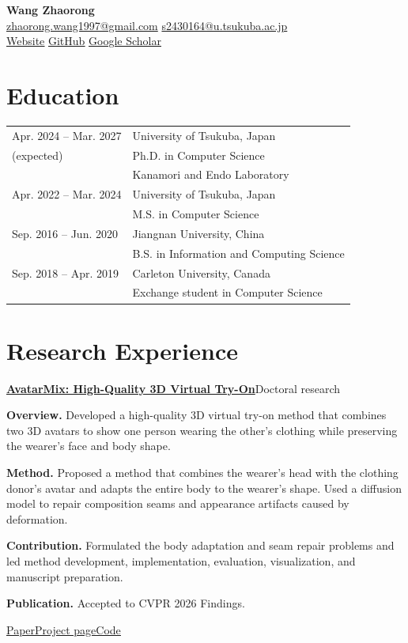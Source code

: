 \documentclass[a4paper,11pt]{article}
\newcommand{\entry}[2]{\Needspace{4\baselineskip}\par\vspace{5pt}\textbf{#1}\hfill #2\par}
\newcommand{\field}[2]{\par\textbf{#1.} #2\par}
\newcommand{\link}[2]{\href{#1}{\underline{#2}}}
\begin{document}
\begin{center}
{\LARGE\bfseries Wang Zhaorong}\\[4pt]
\href{mailto:zhaorong.wang1997@gmail.com}{zhaorong.wang1997@gmail.com}\qquad
\href{mailto:s2430164@u.tsukuba.ac.jp}{s2430164@u.tsukuba.ac.jp}\\[3pt]
\link{https://larsph.github.io/}{Website}\qquad
\link{https://github.com/LarsPh}{GitHub}\qquad
\link{https://scholar.google.com/citations?user=3numV2UAAAAJ}{Google Scholar}
\end{center}
\section{Education}
\begin{tabularx}{\textwidth}{@{}p{53mm}X@{}}
Apr. 2024 -- Mar. 2027 & University of Tsukuba, Japan\\
(expected) & Ph.D. in Computer Science\\
 & Kanamori and Endo Laboratory\\
Apr. 2022 -- Mar. 2024 & University of Tsukuba, Japan\\
 & M.S. in Computer Science\\
Sep. 2016 -- Jun. 2020 & Jiangnan University, China\\
 & B.S. in Information and Computing Science\\
Sep. 2018 -- Apr. 2019 & Carleton University, Canada\\
 & Exchange student in Computer Science
\end{tabularx}
\section{Research Experience}
\entry{\href{https://larsph.github.io/avatarmix/}{AvatarMix: High-Quality 3D Virtual Try-On}}{Doctoral research}
\field{Overview}{Developed a high-quality 3D virtual try-on method that combines two 3D avatars to show one person wearing the other's clothing while preserving the wearer's face and body shape.}
\field{Method}{Proposed a method that combines the wearer's head with the clothing donor's avatar and adapts the entire body to the wearer's shape. Used a diffusion model to repair composition seams and appearance artifacts caused by deformation.}
\field{Contribution}{Formulated the body adaptation and seam repair problems and led method development, implementation, evaluation, visualization, and manuscript preparation.}
\field{Publication}{Accepted to CVPR 2026 Findings.}
\link{https://openaccess.thecvf.com/content/CVPR2026F/html/Wang_AvatarMix_Identity-Preserving_Cross-Avatar_Composition_for_Outfit_Personalization_CVPRF_2026_paper.html}{Paper}\quad \link{https://larsph.github.io/avatarmix/}{Project page}\quad \link{https://github.com/LarsPh/AvatarMix-Code}{Code}
\end{document}
